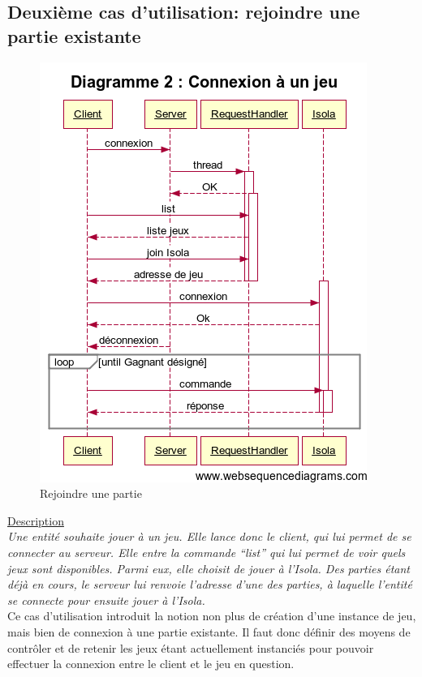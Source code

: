 	\subsection{Deuxième cas d'utilisation: rejoindre une partie existante}
	\begin{figure}[!ht]
		\center
		\includegraphics[scale=0.7]{images/sequence/diagramme_rejoindre.png}
		\caption{Rejoindre une partie}
	\end{figure}
	
	\underline{Description}\\
	
	\textit{Une entité souhaite jouer à un jeu. Elle lance donc le client, qui lui permet de se connecter 
		au serveur. Elle entre la commande “list” qui lui permet de voir quels jeux sont disponibles. 
		Parmi eux, elle choisit de jouer à l'Isola. Des parties étant déjà en cours, le serveur lui renvoie l'adresse d'une des parties, à laquelle l'entité se connecte pour ensuite jouer à l'Isola.}\\
	
	\vspace{3em}
	Ce cas d'utilisation introduit la notion non plus de création d'une instance de jeu, mais bien de connexion à une partie existante. Il faut donc définir des moyens de contrôler et de retenir les jeux étant actuellement instanciés pour pouvoir effectuer la connexion entre le client et le jeu en question.
	\newpage
	
